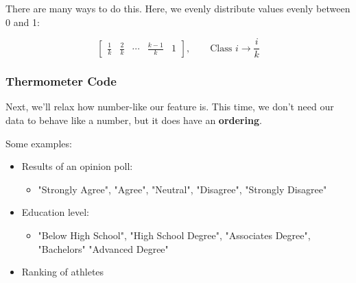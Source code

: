                 \miniex There are many ways to do this. Here, we evenly distribute values evenly between 0 and 1:
    
                    \begin{equation}
                        \begin{bmatrix}
                            \frac{1}{k} & \frac{2}{k} & \cdots & \frac{k-1}{k} & 1
                        \end{bmatrix},
                        \qquad 
                        \text{Class } i \longrightarrow \frac{i}{k}
                    \end{equation}

            \subsecdiv
            \subsubsection*{Thermometer Code}

                Next, we'll relax how number-like our feature is. This time, we don't need our data to behave like a number, but it does have an \textbf{ordering}.

                Some examples:

                \begin{itemize}
                    \item Results of an opinion poll:
                        \begin{itemize}
                            \item "Strongly Agree", "Agree", "Neutral", "Disagree", "Strongly Disagree"
                        \end{itemize}
                    
                    \item Education level: 
                        \begin{itemize}
                            \item "Below High School", "High School Degree", "Associates Degree", "Bachelors" "Advanced Degree"
                        \end{itemize}
                    
                    \item Ranking of athletes
                \end{itemize}

